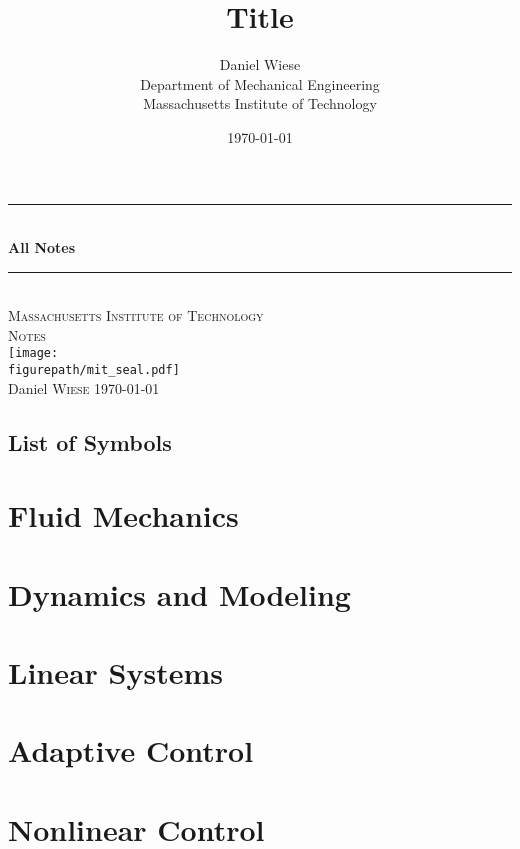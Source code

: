 \documentclass[11pt,letterpaper,onecolumn,notitlepage]{book}
\title{\textbf{Title}}
\author{Daniel Wiese \\ Department of Mechanical Engineering \\ Massachusetts Institute of Technology}
\date{\today}
\newcommand{\figurepath}{../fig}
\def\listofsymbols{ \clearpage}
\begin{document}
  \begin{titlepage}
    \begin{center}
      \rule{\linewidth}{0.01in} \\[0.25in]
      {\huge \bfseries All Notes}\\[0.4cm]
      \rule{\linewidth}{0.01in} \\[0.25in]

      \textsc{\LARGE Massachusetts Institute of Technology}\\[0.15in]
      \textsc{\Large Notes}\\[1.0in]
      \texttt{[image: \\figurepath/mit\_seal.pdf]}\\[2.0in]

      Daniel \textsc{Wiese}
      \vfill
      {\large \today}
    \end{center}
  \end{titlepage}

  \tableofcontents


  \newpage
  \chapter*{List of Symbols\hfill} 
  \listofsymbols{}
  \pagestyle{plain}

  \part{Fluid Mechanics}
  

  \part{Dynamics and Modeling}
  
  

  \part{Linear Systems}
  
  

  \part{Adaptive Control}
  

  \part{Nonlinear Control}
  

  
  
\end{document}
